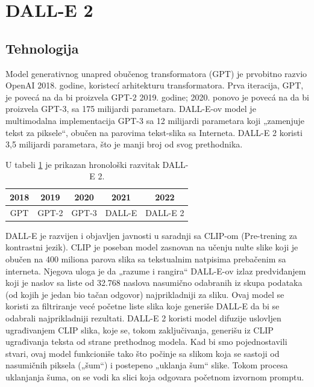 \documentclass[a4paper]{article}
\begin{document}
\section{DALL-E 2}
\label{DALLE2}
\subsection{Tehnologija}
\label{subsec:tehnologija}
Model generativnog unapred obučenog transformatora (GPT) je prvobitno razvio OpenAI 2018. godine, koristecí arhitekturu transformatora. Prva iteracija, GPT, je povecá na da bi proizvela GPT-2 2019. godine; 2020. ponovo je povecá na da bi proizvela GPT-3, sa 175 milijardi parametara. DALL-E-ov model je multimodalna implementacija GPT-3 sa 12 milijardi parametara koji „zamenjuje tekst za piksele“, obučen na parovima tekst-slika sa Interneta. DALL-E 2 koristi 3,5 milijardi parametara, što je manji broj od svog prethodnika.
\begin{table}[h!]
\begin{center}
\caption{U tabeli \ref{tab:tabela1} je prikazan hronološki razvitak DALL-E 2.} 
\vspace{0.5cm}
\begin{tabular}{|c|c|c|c|c|} \hline
2018&2019&2020&2021&2022\\ \hline
GPT&GPT-2&GPT-3 &DALL-E&DALL-E 2\\ \hline
\end{tabular}
\label{tab:tabela1}
\end{center}
\end{table}
DALL-E je razvijen i objavljen javnosti u saradnji sa CLIP-om (Pre-trening za kontrastni jezik). CLIP je poseban model zasnovan na učenju nulte slike koji je obučen na 400 miliona parova slika sa tekstualnim natpisima prebačenim sa interneta. Njegova uloga je da „razume i rangira“ DALL-E-ov izlaz predviđanjem koji je naslov sa liste od 32.768 naslova nasumično odabranih iz skupa podataka (od kojih je jedan bio tačan odgovor) najprikladniji za sliku. Ovaj model se koristi za filtriranje vecé početne liste slika koje generiše DALL-E da bi se odabrali najprikladniji rezultati. DALL-E 2 koristi model difuzije uslovljen ugrađivanjem CLIP slika, koje se, tokom zaključivanja, generišu iz CLIP ugrađivanja teksta od strane prethodnog modela. Kad bi smo pojednostavili stvari, ovaj model funkcioniše tako što počinje sa slikom koja se sastoji od nasumičnih piksela („šum“) i postepeno „uklanja šum“ slike. Tokom procesa uklanjanja
šuma, on se vodi ka slici koja odgovara početnom izvornom promptu.
\end{document}
